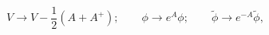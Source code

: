 \begin{equation}
V \to V - \frac{1}{2}(A+A^+);
\qquad \phi\to e^{A}\phi;\qquad \tilde\phi\to e^{-A} \tilde\phi,
\end{equation}

